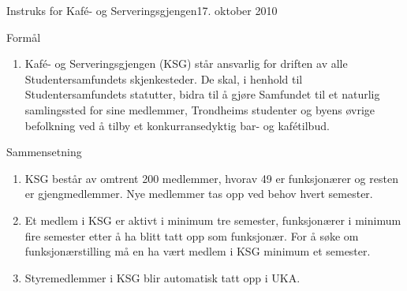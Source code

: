 
\begin{instruks}{Instruks for Kafé- og Serveringsgjengen}{17. oktober 2010}{ }

    \begin{instruksledd}{Formål}
        \begin{enumerate}
            \item Kafé- og Serveringsgjengen (KSG) står ansvarlig for driften av alle
                Studentersamfundets skjenkesteder. De skal, i henhold til Studentersamfundets statutter, bidra til å
                gjøre Samfundet til et naturlig samlingssted for sine medlemmer, Trondheims studenter og byens
                øvrige befolkning ved å tilby et konkurransedyktig bar- og kafétilbud.
        \end{enumerate}
    \end{instruksledd}

    \begin{instruksledd}{Sammensetning}
        \begin{enumerate}
            \item KSG består av omtrent 200 medlemmer, hvorav 49 er funksjonærer og resten er
                gjengmedlemmer. Nye medlemmer tas opp ved behov hvert semester.
            \item Et medlem i KSG er aktivt i minimum tre semester, funksjonærer i minimum fire
                semester etter å ha blitt tatt opp som funksjonær. For å søke om funksjonærstilling må en ha vært
                medlem i KSG minimum et semester.
            \item Styremedlemmer i KSG blir automatisk tatt opp i UKA.
        \end{enumerate}
    \end{instruksledd}


\end{instruks}
